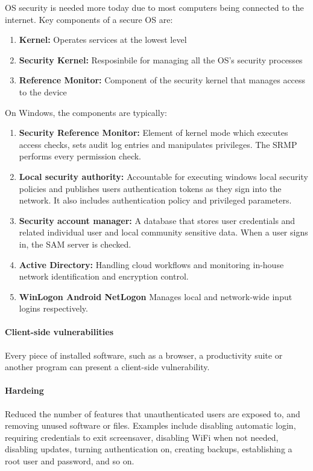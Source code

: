 OS security is needed more today due to most computers being connected to the internet. Key components of a secure OS are:

\begin{enumerate}
    \item \textbf{Kernel:} Operates services at the lowest level
    \item \textbf{Security Kernel:} Resposinbile for managing all the OS's security processes
    \item \textbf{Reference Monitor:} Component of the security kernel that manages access to the device
\end{enumerate}

On Windows, the components are typically:

\begin{enumerate}
    \item \textbf{Security Reference Monitor:} Element of kernel mode which executes access checks, sets audit log entries and manipulates privileges. The SRMP performs every permission check.
    \item \textbf{Local security authority:} Accountable for executing windows local security policies and publishes users authentication tokens as they sign into the network. It also includes authentication policy and privileged parameters.
    \item \textbf{Security account manager:} A database that stores user credentials and related individual user and local community sensitive data. When a user signs in, the SAM server is checked. 
    \item \textbf{Active Directory:} Handling cloud workflows and monitoring in-house network identification and encryption control.
    \item \textbf{WinLogon Android NetLogon} Manages local and network-wide input logins respectively.
\end{enumerate}

\paragraph{Client-side vulnerabilities} Every piece of installed software, such as a browser, a productivity suite or another program can present a client-side vulnerability. 

\paragraph{Hardeing} Reduced the number of features that unauthenticated users are exposed to, and removing unused software or files. Examples include disabling automatic login, requiring credentials to exit screensaver, disabling WiFi when not needed, disabling updates, turning authentication on, creating backups, establishing a root user and password, and so on.

